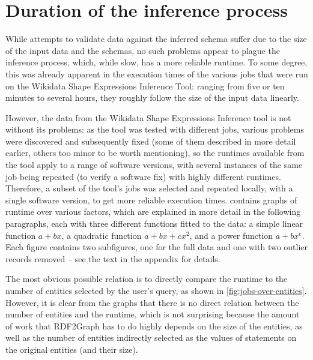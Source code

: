 
\section{Duration of the inference process}
\label{sec:Evaluation:duration}

While attempts to validate data against the inferred schema
suffer due to the size of the input data and the schemas,
no such problems appear to plague the inference process,
which, while slow, has a more reliable runtime.
To some degree, this was already apparent in the execution times
of the various jobs that were run on the Wikidata Shape Expressions Inference Tool:
ranging from five or ten minutes to several hours,
they roughly follow the size of the input data linearly.

However, the data from the Wikidata Shape Expressions Inference tool
is not without its problems:
as the tool was tested with different jobs,
various problems were discovered and subsequently fixed
(some of them described in more detail earlier, others too minor to be worth mentioning),
so the runtimes available from the tool apply to a range of software versions,
with several instances of the same job being repeated (to verify a software fix)
with highly different runtimes.
Therefore, a subset of the tool’s jobs was selected
and repeated locally, with a single software version,
to get more reliable execution times.
 contains graphs of runtime over various factors,
which are explained in more detail in the following paragraphs,
each with three different functions fitted to the data:
a simple linear function $a+bx$,
a quadratic function $a+bx+cx^2$,
and a power function $a+bx^c$.
Each figure contains two subfigures,
one for the full data and one with two outlier records removed –
see the text in the appendix for details.

The most obvious possible relation is
to directly compare the runtime to the number of entities selected by the user’s query,
as shown in \cref{fig:jobs-over-entities}.
However, it is clear from the graphs that there is no direct relation
between the number of entities and the runtime,
which is not surprising because the amount of work that RDF2Graph has to do
highly depends on the size of the entities,
as well as the number of entities indirectly selected as the values of statements on the original entities (and their size).

